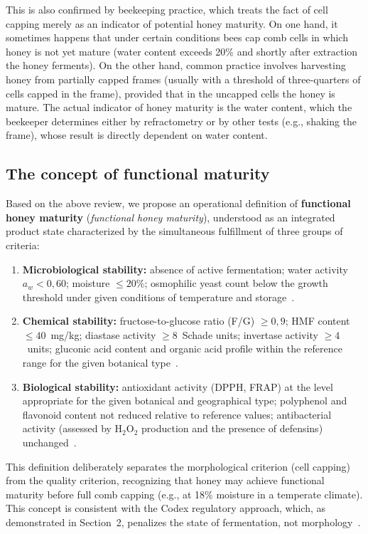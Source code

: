 This is also confirmed by beekeeping practice, which treats the
fact of cell capping merely as an indicator of potential honey
maturity. On one hand, it sometimes happens that under certain
conditions bees cap comb cells in which honey is not yet mature
(water content exceeds 20\% and shortly after extraction the honey
ferments). On the other hand, common practice involves harvesting
honey from partially capped frames (usually with a threshold of
three-quarters of cells capped in the frame), provided that in
the uncapped cells the honey is mature. The actual indicator of
honey maturity is the water content, which the beekeeper determines
either by refractometry or by other tests (e.g., shaking the frame),
whose result is directly dependent on water content.

\subsection{The concept of functional maturity}
Based on the above review, we propose an operational definition of
\textbf{functional honey maturity} (\textit{functional honey
maturity}), understood as an integrated product state characterized
by the simultaneous fulfillment of three groups of criteria:

\begin{enumerate}
    \item \textbf{Microbiological stability:} absence of active
          fermentation; water activity $a_w < 0{,}60$; moisture
          $\leq 20\%$; osmophilic yeast count below the growth
          threshold under given conditions of temperature
          and storage~\cite{zamora2006}.

    \item \textbf{Chemical stability:} fructose-to-glucose ratio
          (F/G) $\geq 0{,}9$; HMF content $\leq 40$~mg/kg;
          diastase activity $\geq 8$~Schade units; invertase
          activity $\geq 4$~units; gluconic acid content and
          organic acid profile within the reference range
          for the given botanical type~\cite{codex_stan12,zhang2021}.

    \item \textbf{Biological stability:} antioxidant activity
          (DPPH, FRAP) at the level appropriate for the given
          botanical and geographical type; polyphenol and flavonoid
          content not reduced relative to reference values;
          antibacterial activity (assessed by H$_2$O$_2$ production
          and the presence of defensins)
          unchanged~\cite{guo2020}.
\end{enumerate}

This definition deliberately separates the morphological criterion
(cell capping) from the quality criterion, recognizing that honey
may achieve functional maturity before full comb capping (e.g., at
18\% moisture in a temperate climate). This concept is consistent
with the Codex regulatory approach, which, as demonstrated in
Section~2, penalizes the state of fermentation, not
morphology~\cite{codex_stan12,sun2021}.
